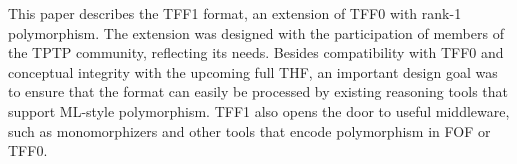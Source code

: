 This paper describes the TFF1
format, an extension of TFF0 with rank-1 polymorphism. The
extension was designed with the participation of members of the TPTP community,
reflecting its needs.
Besides compatibility with TFF0 and conceptual integrity with the upcoming full
THF, an important design goal was to ensure that the format can easily be
processed by existing reasoning tools that support ML-style polymorphism. TFF1
also opens the door to useful middleware, such as monomorphizers and other
tools that encode polymorphism in FOF or TFF0.

